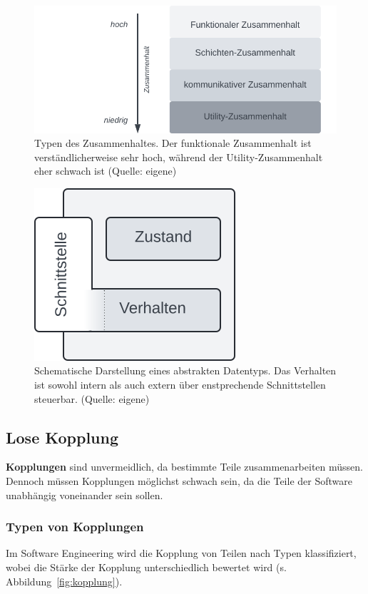 \begin{figure}
    \centering
    \includegraphics[scale=0.4]{part two/Objektorientierter Entwurf/img/zusammenhalt}
    \caption{Typen des Zusammenhaltes. Der funktionale Zusammenhalt ist verständlicherweise sehr hoch, während der Utility-Zusammenhalt eher schwach ist (Quelle: eigene)}
    \label{fig:zusammenhalt}
\end{figure}


\begin{figure}
    \centering
    \includegraphics[scale=0.4]{part two/Objektorientierter Entwurf/img/adt}
    \caption{Schematische Darstellung eines abstrakten Datentyps. Das Verhalten ist sowohl intern als auch extern über enstprechende Schnittstellen steuerbar.  (Quelle: eigene)}
    \label{fig:adt}
\end{figure}

\subsection{Lose Kopplung}
\textbf{Kopplungen} sind unvermeidlich, da bestimmte Teile zusammenarbeiten müssen.\\
Dennoch müssen Kopplungen möglichst schwach sein, da die Teile der Software unabhängig voneinander sein sollen.

\subsubsection*{Typen von Kopplungen}
Im Software Engineering wird die Kopplung von Teilen nach Typen klassifiziert, wobei die Stärke der Kopplung unterschiedlich bewertet wird (s. Abbildung~\ref{fig:kopplung}).


